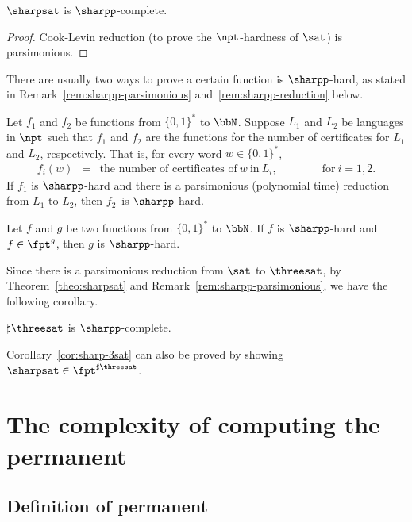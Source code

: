 \documentclass[11pt, a4paper]{article}
\begin{document}
\begin{theorem}
\label{theo:sharpsat}
$\sharpsat$ is $\sharpp$-complete.
\end{theorem}
\begin{proof}
Cook-Levin reduction (to prove the $\npt$-hardness of $\sat$) is parsimonious.
\end{proof}

There are usually two ways to prove a certain function is $\sharpp$-hard,
as stated in Remark~\ref{rem:sharpp-parsimonious} and~\ref{rem:sharpp-reduction} below.


\begin{remark}
\label{rem:sharpp-parsimonious}
Let $f_1$ and $f_2$ be functions from $\{0,1\}^*$ to $\bbN$.
Suppose $L_1$ and $L_2$ be languages in $\npt$ such that
$f_1$ and $f_2$ are the functions for the number of certificates for $L_1$ and $L_2$, respectively.
That is, for every word $w\in \{0,1\}^*$,
\begin{eqnarray*}
f_i(w) & = & \text{the number of certificates of} \ w\ \text{in}\ L_i,\qquad\qquad\text{for}\ i=1,2.
\end{eqnarray*}
If $f_1$ is $\sharpp$-hard and there is a parsimonious (polynomial time) reduction from $L_1$ to $L_2$,
then $f_2$~is $\sharpp$-hard.
\end{remark}

\begin{remark}
\label{rem:sharpp-reduction}
Let $f$ and $g$ be two functions from $\{0,1\}^*$ to $\bbN$.
If $f$ is $\sharpp$-hard and $f\in\fpt^g$, then $g$ is $\sharpp$-hard.
\end{remark}

Since there is a parsimonious reduction from $\sat$ to $\threesat$,
by Theorem~\ref{theo:sharpsat} and Remark~\ref{rem:sharpp-parsimonious},
we have the following corollary.

\begin{corollary}
\label{cor:sharp-3sat}
$\sharp\threesat$ is $\sharpp$-complete.
\end{corollary}

Corollary~\ref{cor:sharp-3sat} can also be proved by showing $\sharpsat \in \fpt^{\sharp\threesat}$.


\section{The complexity of computing the permanent}
\label{sec:permanent}

\subsection{Definition of permanent}
\label{subsec:def-permanent}
\end{document}
